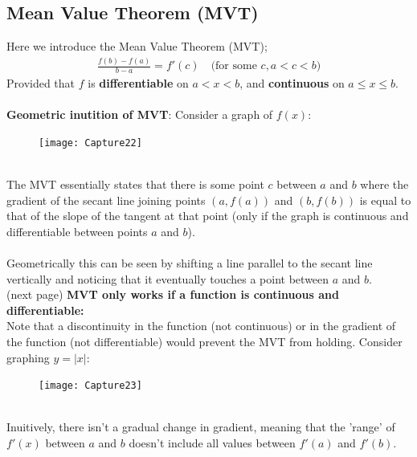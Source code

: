 \documentclass{report}
\begin{document}
\subsection{Mean Value Theorem (MVT)} %
Here we introduce the Mean Value Theorem (MVT);
\begin{align*}
\frac{f(b)-f(a)}{b-a}=f'(c)\quad\text{(for some $c,a<c<b$)}
\end{align*}
Provided that $f$ is \textbf{differentiable} on $a<x<b$,
and \textbf{continuous} on $a\leq x\leq b$.\\
\vspace{1mm}\\
\textbf{Geometric inutition of MVT}: Consider
a graph of $f(x)$:
\begin{figure}[h]
\texttt{[image: Capture22]}\\
\centering
{}
\end{figure}\\
The MVT essentially states that there is some point $c$ between $a$ and $b$ 
where the gradient of the secant line joining points $(a,f(a))$ and $(b,f(b))$ 
is equal to that of the slope of the tangent at that point 
(only if the graph is continuous and differentiable between points $a$ and $b$).\\
\vspace{1mm}\\
Geometrically this can be seen by shifting a line parallel to the secant line
vertically and noticing that it eventually touches a point between $a$ and $b$.\\
(next page)
\newpage
\noindent\textbf{MVT only works if a function is continuous and differentiable:}\\
Note that a discontinuity in the function (not continuous) or in the gradient 
of the function (not differentiable) would prevent the MVT from holding. Consider graphing $y=|x|$:\\
\begin{figure}[h]
\texttt{[image: Capture23]}\\
\centering
{}
\end{figure}\\
Inuitively, there isn't a gradual change in gradient, meaning
that the 'range' of $f'(x)$ between $a$ and $b$ doesn't include all values
between $f'(a)$ and $f'(b)$.
\newpage
\end{document}
